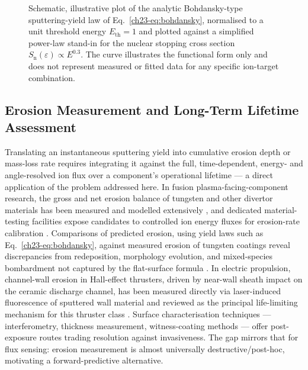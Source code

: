 \begin{figure}[htbp]
\centering
{}
\caption{Schematic, illustrative plot of the analytic Bohdansky-type sputtering-yield law of Eq.~\eqref{ch23-eq:bohdansky}, normalised to a unit threshold energy $E_{\mathrm{th}}=1$ and plotted against a simplified power-law stand-in for the nuclear stopping cross section $S_{\mathrm{n}}(\varepsilon)\propto E^{0.3}$. The curve illustrates the functional form only and does not represent measured or fitted data for any specific ion-target combination.}
\label{fig:sputter-yield}
\end{figure}

\subsection{Erosion Measurement and Long-Term Lifetime Assessment}

Translating an instantaneous sputtering yield into cumulative erosion depth or mass-loss rate requires integrating it against the full, time-dependent, energy- and angle-resolved ion flux over a component's operational lifetime — a direct application of the problem addressed here. In fusion plasma-facing-component research, the gross and net erosion balance of tungsten and other divertor materials has been measured and modelled extensively \cite{ref0158}, and dedicated material-testing facilities expose candidates to controlled ion energy fluxes for erosion-rate calibration \cite{ref0586}. Comparisons of predicted erosion, using yield laws such as Eq.~\eqref{ch23-eq:bohdansky}, against measured erosion of tungsten coatings reveal discrepancies from redeposition, morphology evolution, and mixed-species bombardment not captured by the flat-surface formula \cite{ref0593}. In electric propulsion, channel-wall erosion in Hall-effect thrusters, driven by near-wall sheath impact on the ceramic discharge channel, has been measured directly via laser-induced fluorescence of sputtered wall material \cite{ref0454} and reviewed as the principal life-limiting mechanism for this thruster class \cite{ref0440}. Surface characterisation techniques — interferometry, thickness measurement, witness-coating methods — offer post-exposure routes trading resolution against invasiveness. The gap mirrors that for flux sensing: erosion measurement is almost universally destructive/post-hoc, motivating a forward-predictive alternative.


